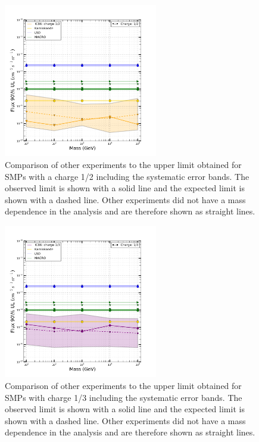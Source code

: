 \begin{figure}
\centering
\includegraphics[width=0.6\textwidth]{chapter8/img/UpperLimitPlot_masses_withunc_0p5}
\caption{Comparison of other experiments to the upper limit obtained for SMPs with a charge 1/2 including the systematic error bands. The observed limit is shown with a solid line and the expected limit is shown with a dashed line. Other experiments did not have a mass dependence in the analysis and are therefore shown as straight lines.}
\label{fig:moneyplot2}
\end{figure}

\begin{figure}
\centering
\includegraphics[width=0.6\textwidth]{chapter8/img/UpperLimitPlot_masses_withunc_0p333333333333}
\caption{Comparison of other experiments to the upper limit obtained for SMPs with charge 1/3 including the systematic error bands. The observed limit is shown with a solid line and the expected limit is shown with a dashed line. Other experiments did not have a mass dependence in the analysis and are therefore shown as straight lines.}
\label{fig:moneyplot3}
\end{figure}


